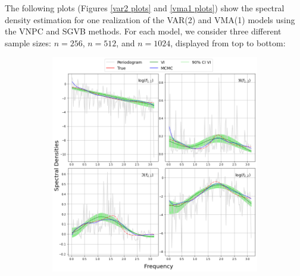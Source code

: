 \documentclass[12pt,a4paper]{article}
\begin{document}
The following plots (Figures \ref{var2 plots} and \ref{vma1 plots}) show the spectral density estimation for one realization of the VAR(2) and VMA(1) models using the VNPC and SGVB methods. For each model, we consider three different sample sizes: $n = 256$, $n = 512$, and $n = 1024$, displayed from top to bottom:
\begin{figure}[H]
\centering
\begin{subfigure}{\textwidth} %
  \centering
  \includegraphics[width=18cm]{VAR(2) with length 256 by variational inference and VNPC.png}
\end{subfigure}


\end{figure}
\end{document}
